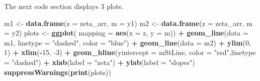 \documentclass[
]{book}
\newenvironment{Shaded}{\begin{snugshade}}{\end{snugshade}}
\newcommand{\DataTypeTok}[1]{\textcolor[rgb]{0.13,0.29,0.53}{#1}}
\newcommand{\DecValTok}[1]{\textcolor[rgb]{0.00,0.00,0.81}{#1}}
\newcommand{\KeywordTok}[1]{\textcolor[rgb]{0.13,0.29,0.53}{\textbf{#1}}}
\newcommand{\NormalTok}[1]{#1}
\newcommand{\OperatorTok}[1]{\textcolor[rgb]{0.81,0.36,0.00}{\textbf{#1}}}
\newcommand{\StringTok}[1]{\textcolor[rgb]{0.31,0.60,0.02}{#1}}
\begin{document}
The next code section displays 3 plots.

\begin{Shaded}
\begin{Highlighting}[]
\NormalTok{m1 <-}\StringTok{ }\KeywordTok{data.frame}\NormalTok{(}\DataTypeTok{z =}\NormalTok{ zeta_arr, }\DataTypeTok{m =}\NormalTok{ y1)}
\NormalTok{m2 <-}\StringTok{ }\KeywordTok{data.frame}\NormalTok{(}\DataTypeTok{z =}\NormalTok{ zeta_arr, }\DataTypeTok{m =}\NormalTok{ y2)}
\NormalTok{plots <-}\StringTok{ }\KeywordTok{ggplot}\NormalTok{(}
  \DataTypeTok{mapping =} \KeywordTok{aes}\NormalTok{(}\DataTypeTok{x =}\NormalTok{ z, }\DataTypeTok{y =}\NormalTok{ m)) }\OperatorTok{+}\StringTok{ }
\StringTok{  }\KeywordTok{geom_line}\NormalTok{(}\DataTypeTok{data =}\NormalTok{ m1, }\DataTypeTok{linetype =} \StringTok{"dashed"}\NormalTok{, }\DataTypeTok{color =} \StringTok{"blue"}\NormalTok{) }\OperatorTok{+}\StringTok{ }
\StringTok{  }\KeywordTok{geom_line}\NormalTok{(}\DataTypeTok{data =}\NormalTok{ m2) }\OperatorTok{+}
\StringTok{  }\KeywordTok{ylim}\NormalTok{(}\DecValTok{0}\NormalTok{, }\DecValTok{1}\NormalTok{) }\OperatorTok{+}\StringTok{ }\KeywordTok{xlim}\NormalTok{(}\OperatorTok{-}\DecValTok{15}\NormalTok{, }\DecValTok{-3}\NormalTok{) }\OperatorTok{+}\StringTok{ }
\StringTok{  }\KeywordTok{geom_hline}\NormalTok{(}\DataTypeTok{yintercept =}\NormalTok{ mStLine, }\DataTypeTok{color =} \StringTok{"red"}\NormalTok{,}\DataTypeTok{linetype =} \StringTok{"dashed"}\NormalTok{) }\OperatorTok{+}\StringTok{ }
\StringTok{  }\KeywordTok{xlab}\NormalTok{(}\DataTypeTok{label =} \StringTok{"zeta"}\NormalTok{) }\OperatorTok{+}\StringTok{ }\KeywordTok{ylab}\NormalTok{(}\DataTypeTok{label =} \StringTok{"slopes"}\NormalTok{)}
\KeywordTok{suppressWarnings}\NormalTok{(}\KeywordTok{print}\NormalTok{(plots))}
\end{Highlighting}
\end{Shaded}
\end{document}
